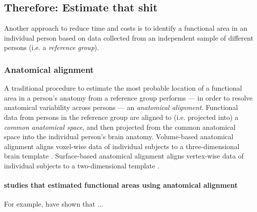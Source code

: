 \subsection{Therefore: Estimate that shit}

Another approach to reduce time and costs is to identify a functional area in an
individual person based on data collected from an independent sample of
different persons (i.e. a \textit{reference group}).



\subsubsection{Anatomical alignment}

%
A traditional procedure \citep{frost2012measuring, weiner2018defining,
zhen2017quantifying, zhen2015quantifying, rosenke2021probabilistic,
wang2015probabilistic} to estimate the most probable location of a functional
area in a person's anatomy from a reference group performs --- in order to
resolve anatomical variability across persons --- an \textit{anatomical
alignment}.
%
Functional data from persons in the reference group are aligned to (i.e.
projected into) a \textit{common anatomical space}, and then projected from the
common anatomical space into the individual person's brain anatomy.
Volume-based anatomical alignment \citep[s.][for a review]{klein2009evaluation}
aligns voxel-wise data of individual subjects to a three-dimensional brain
template \citep[e.g., MNI152 template;][]{fonov2011unbiased}.
Surface-based anatomical alignment \citep{fischl1999cortical} aligns vertex-wise
data of individual subjects to a two-dimensional template \citep[e.g.,
FreeSurfer fsaverage template;][]{fischl1999high}.


\paragraph{studies that estimated functional areas using anatomical alignment}



For example, \citep{frost2012measuring, weiner2018defining,
zhen2017quantifying, zhen2015quantifying, rosenke2021probabilistic,
wang2015probabilistic} have shown that ...


